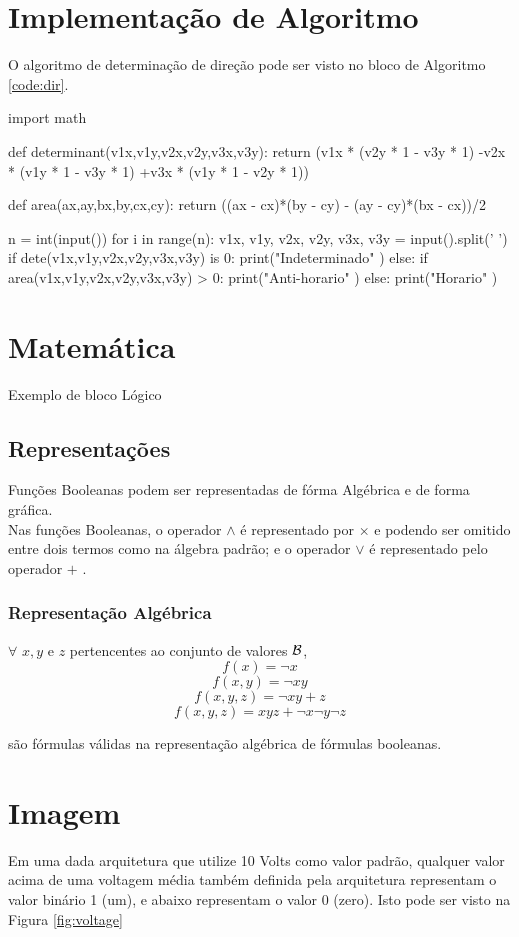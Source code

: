 
\section{Implementação de Algoritmo}

O algoritmo de determinação de direção pode ser visto no bloco de Algoritmo \ref{code:dir}.
\begin{code}[language=Python,caption=Direction Algorithm,label=code:dir]
import math

def determinant(v1x,v1y,v2x,v2y,v3x,v3y):
    return (v1x * (v2y * 1 - v3y * 1)
           -v2x * (v1y * 1 - v3y * 1)
           +v3x * (v1y * 1 - v2y * 1))

def area(ax,ay,bx,by,cx,cy):
        return ((ax - cx)*(by - cy) - (ay - cy)*(bx - cx))/2

n = int(input())
for i in range(n):
        v1x, v1y, v2x, v2y, v3x, v3y = input().split(' ')
        if dete(v1x,v1y,v2x,v2y,v3x,v3y) is 0:
                print("Indeterminado" )
        else:
                if area(v1x,v1y,v2x,v2y,v3x,v3y) > 0:
                        print("Anti-horario" )
                else:
                        print("Horario" )

\end{code}

\section{Matemática}
Exemplo de bloco Lógico
\subsection{Representações}
Funções Booleanas podem ser representadas de fórma Algébrica e de forma gráfica.\\
Nas funções Booleanas, o operador $\land$ é representado por $ \times $ e podendo ser omitido entre dois termos como na álgebra padrão; e o operador $\lor$ é representado pelo operador $+$ .
\subsubsection{Representação Algébrica}
$\forall$ $x, y$ e $z$ pertencentes ao conjunto de valores $ \cal {B}$,\\
\[f(x)=\neg x\]
\[f(x,y)=\neg x y\]
\[f(x,y,z)=\neg xy+z\]
\[f(x,y,z)=xyz+\neg x \neg y \neg z\]

são fórmulas válidas na representação algébrica de fórmulas booleanas.

\section{Imagem}
Em uma dada arquitetura que utilize 10 Volts como valor padrão, qualquer valor acima de uma voltagem média também definida pela arquitetura representam o valor binário 1 (um), e abaixo representam o valor 0 (zero). Isto pode ser visto na Figura \ref{fig:voltage}

